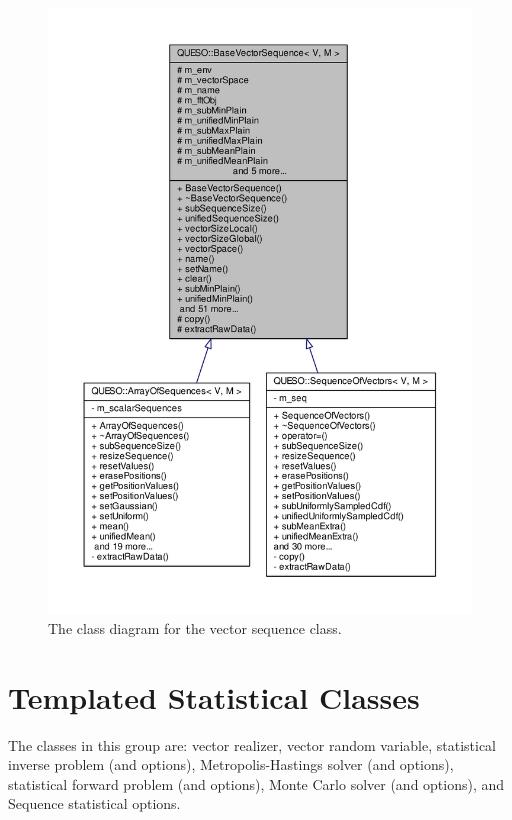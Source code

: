 \begin{figure}[htpb]
\centering
\includegraphics[scale=0.65,clip=true]{rawfigs/vector_sequence}
\vspace{-1.cm}
\caption{The class diagram for the vector sequence class.}
\label{fig-vector-sequence-class}
\end{figure}



\section{Templated Statistical Classes}

The classes in this group are: vector realizer, vector random variable, statistical inverse problem (and options), Metropolis-Hastings solver (and options), statistical forward problem (and options), Monte Carlo solver (and options), and Sequence statistical options.

